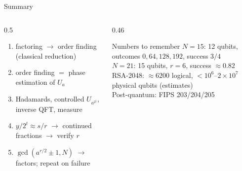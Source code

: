 \documentclass[aspectratio=169,11pt]{beamer}
\begin{document}
\begin{frame}[label=fSummary]{Summary}
  \begin{columns}[T]
    \begin{column}{0.5\textwidth}
      \small
      \begin{enumerate}\itemsep1pt
        \item factoring $\to$ order finding (classical reduction)
        \item order finding $=$ phase estimation of $U_a$
        \item Hadamards, controlled $U_{a^{2^j}}$, inverse QFT, measure
        \item $y/2^t \approx s/r$ $\to$ continued fractions $\to$ verify $r$
        \item $\gcd(a^{r/2} \pm 1, N)$ $\to$ factors; repeat on failure
      \end{enumerate}
    \end{column}
    \begin{column}{0.46\textwidth}
      \begin{block}{Numbers to remember}
        \scriptsize
        $N = 15$: 12 qubits, outcomes $0, 64, 128, 192$, success $3/4$\\
        $N = 21$: 15 qubits, $r = 6$, success $\approx0.82$\\
        RSA-2048: $\approx6200$ logical, $< 10^6$--$2\times10^7$ physical qubits (estimates)\\
        Post-quantum: FIPS 203/204/205
      \end{block}
    \end{column}
  \end{columns}
\end{frame}
\end{document}
